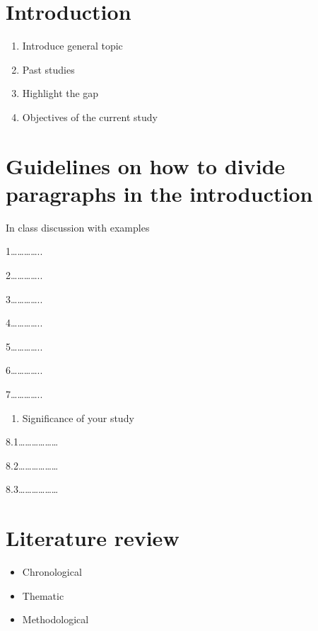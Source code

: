 \documentclass[
  letterpaper,
  DIV=11,
  numbers=noendperiod]{scrreprt}
\providecommand{\tightlist}{%
  \setlength{\itemsep}{0pt}\setlength{\parskip}{0pt}}\usepackage{longtable,booktabs,array}
\begin{document}
\section{Introduction}\label{introduction}

\begin{enumerate}
\def\labelenumi{\arabic{enumi}.}
\item
  Introduce general topic
\item
  Past studies
\item
  Highlight the gap
\item
  Objectives of the current study
\end{enumerate}

\section{Guidelines on how to divide paragraphs in the
introduction}\label{guidelines-on-how-to-divide-paragraphs-in-the-introduction}

In class discussion with examples

1\ldots\ldots\ldots\ldots..

2\ldots\ldots\ldots\ldots..

3\ldots\ldots\ldots\ldots..

4\ldots\ldots\ldots\ldots..

5\ldots\ldots\ldots\ldots..

6\ldots\ldots\ldots\ldots..

7\ldots\ldots\ldots\ldots..

\begin{enumerate}
\def\labelenumi{\arabic{enumi}.}
\setcounter{enumi}{7}
\tightlist
\item
  Significance of your study
\end{enumerate}

8.1\ldots\ldots\ldots\ldots\ldots\ldots{}

8.2\ldots\ldots\ldots\ldots\ldots\ldots{}

8.3\ldots\ldots\ldots\ldots\ldots\ldots{}

\section{Literature review}\label{literature-review}

\begin{itemize}
\item
  Chronological
\item
  Thematic
\item
  Methodological
\end{itemize}
\end{document}
